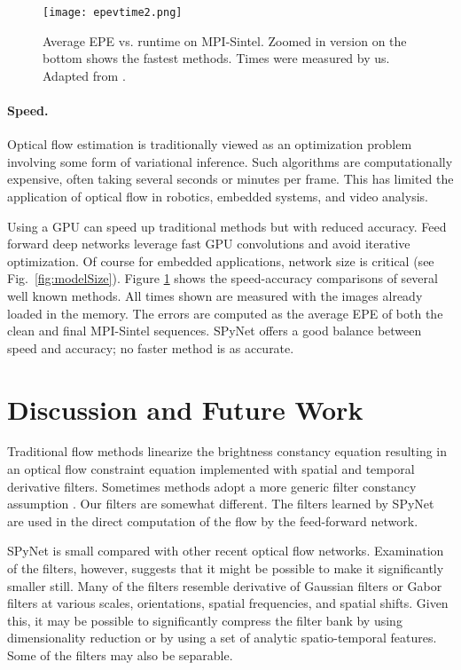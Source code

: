 \documentclass[10pt,twocolumn,letterpaper]{article}
\begin{document}
\begin{figure}[t]
\centerline{
   \texttt{[image: epevtime2.png]}
}
   \caption{Average EPE vs. runtime on MPI-Sintel. 
Zoomed in version on the bottom shows the fastest methods. Times were measured by us. Adapted from \cite{wulff2015efficient}. }
\label{fig:epevtime}
\end{figure}

\paragraph{Speed.}
 Optical flow estimation is traditionally viewed as an optimization problem involving some form of variational inference.
Such algorithms are  computationally expensive, often taking several seconds or minutes per frame.
This has limited the application of optical flow in robotics, embedded systems, and video analysis.

Using a GPU can speed up traditional methods \cite{sundaram2010dense,Werlberger2009:GPUflow} but with reduced accuracy.
Feed forward deep networks \cite{dosovitskiy2015flownet} leverage fast
GPU convolutions and avoid iterative optimization.
Of course for embedded applications, network size is critical (see Fig.~\ref{fig:modelSize}).
Figure \ref{fig:epevtime} shows the speed-accuracy comparisons of several well known methods.
All times shown are measured with the images already loaded in the memory. 
The errors are computed as the average EPE of both the clean and final MPI-Sintel sequences. 
SPyNet offers a good balance between speed and accuracy; no
faster method  is as accurate.

\section{Discussion and Future Work}
Traditional flow methods linearize the brightness constancy equation resulting in an optical flow constraint equation
implemented with spatial and temporal derivative filters.
Sometimes methods adopt a more generic filter constancy assumption \cite{adelson1984pyramid,brox2004high}.
Our filters are somewhat different.  
The filters learned by SPyNet are used in the direct computation of the flow by the feed-forward network.  


SPyNet is small compared with other recent optical flow networks.
Examination of the filters, however, suggests that it might be possible to make it significantly smaller still.
Many of the filters resemble derivative of Gaussian filters or Gabor filters at various scales, orientations, spatial frequencies, and spatial shifts.
Given this, it may be possible to significantly compress the filter bank by using dimensionality reduction or by using a set of analytic spatio-temporal features.
Some of the filters may also be separable.
\end{document}
